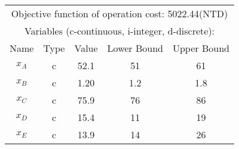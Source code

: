 \begin{tabular}{ccccc}
\hline
\multicolumn{5}{c}{Objective function of operation cost: 5022.44(NTD)}\\
\multicolumn{5}{c}{Variables (c-continuous, i-integer, d-discrete):} \\
\hline
Name & Type & Value & Lower Bound & Upper Bound \\
\hline \hline
$x_A$ & c & 52.1 & 51 & 61 \\
$x_B$ & c & 1.20 & 1.2 & 1.8 \\
$x_C$ & c & 75.9 & 76 & 86 \\
$x_D$ & c & 15.4 & 11 & 19 \\
$x_E$ & c & 13.9 & 14 & 26 \\
\hline
\end{tabular}